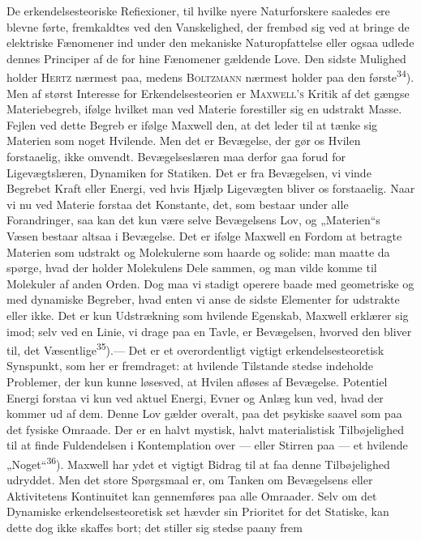 \documentclass[12pt,a4paper,openany]{book}
\newcommand{\opage}[1]{\marginnote{\footnotesize\textit{[#1]}}}
\begin{document}
De erkendelsesteoriske Refiexioner, til hvilke nyere Naturforskere saaledes ere
blevne førte, fremkaldtes ved den Vanskelighed, der frembød sig ved at bringe
de elektriske Fænomener ind under den mekaniske Naturopfattelse eller ogsaa
udlede dennes Principer af de for hine Fænomener gældende Love. Den sidste
Mulighed holder \textsc{Hertz} nærmest paa, medens \textsc{Boltzmann} nærmest
holder paa den første\textsuperscript{34}). Men af størst Interesse for
Erkendelsesteorien er \textsc{Maxwell's} Kritik af det gængse Materiebegreb,
ifølge hvilket man ved Materie forestiller sig en udstrakt Masse. Fejlen ved
dette Begreb er ifølge Maxwell den, at det leder til at tænke sig Materien som
noget Hvilende. Men det er Bevægelse, der gør os Hvilen forstaaelig, ikke
omvendt. Bevægelseslæren maa derfor gaa forud for Ligevægtslæren, Dynamiken for
Statiken. Det er fra Bevægelsen, vi vinde Begrebet Kraft eller Energi, ved hvis
Hjælp Ligevægten bliver os forstaaelig. Naar vi nu ved Materie forstaa det
Konstante, det, som bestaar under alle Forandringer, saa kan det kun være selve
Bevægelsens Lov, og „Materien“s Væsen bestaar altsaa i Bevægelse. Det er ifølge
Maxwell en Fordom at betragte Materien som udstrakt og Molekulerne som haarde
og solide: man maatte da spørge, hvad der holder Molekulens Dele sammen, og
\opage{42}man vilde komme til Molekuler af anden Orden. Dog maa vi stadigt
operere baade med geometriske og med dynamiske Begreber, hvad enten vi anse de
sidste Elementer for udstrakte eller ikke. Det er kun Udstrækning som hvilende
Egenskab, Maxwell erklærer sig imod; selv ved en Linie, vi drage paa en Tavle,
er Bevægelsen, hvorved den bliver til, det Væsentlige\textsuperscript{35}).---
Det er et overordentligt vigtigt erkendelsesteoretisk Synspunkt, som her er
fremdraget: at hvilende Tilstande stedse indeholde Problemer, der kun kunne
løsesved, at Hvilen afløses af Bevægelse. Potentiel Energi forstaa vi kun ved
aktuel Energi, Evner og Anlæg kun ved, hvad der kommer ud af dem. Denne Lov
gælder overalt, paa det psykiske saavel som paa det fysiske Omraade. Der er en
halvt mystisk, halvt materialistisk Tilbøjelighed til at finde Fuldendelsen i
Kontemplation over --- eller Stirren paa --- et hvilende
„Noget“\textsuperscript{36}). Maxwell har ydet et vigtigt Bidrag til at faa
denne Tilbøjelighed udryddet. Men det store Spørgsmaal er, om Tanken om
Bevægelsens eller Aktivitetens Kontinuitet kan gennemføres paa alle Omraader.
Selv om det Dynamiske erkendelsesteoretisk set hævder sin Prioritet for det
Statiske, kan dette dog ikke skaffes bort; det stiller sig stedse paany frem
\end{document}
